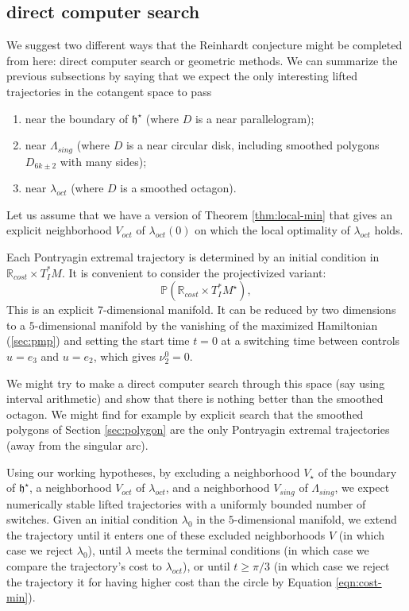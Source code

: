\documentclass{article}
\theoremstyle{remark}
\newcommand{\ring}[1]{\mathbb{#1}}
\def\hstar{{\mathfrak h}^\star}
\newcommand\Lsing{\Lambda_{sing}}
\begin{document}
\subsection{direct computer search}

We suggest two different ways that the Reinhardt conjecture might be
completed from here: direct computer search or geometric methods.
We can summarize the previous subsections by saying that we expect
the only interesting lifted trajectories in the cotangent space to pass
\begin{enumerate}
\item near the boundary of $\hstar$ (where $D$ is a near parallelogram);
\item near $\Lsing$ (where $D$ is a near circular disk, including
  smoothed polygons $D_{6k\pm 2}$ with many sides);
\item near $\lambda_{oct}$ (where $D$ is a smoothed octagon).
\end{enumerate}
Let us assume that we have a version of Theorem \ref{thm:local-min} that gives
an explicit neighborhood $V_{oct}$ of $\lambda_{oct}(0)$ on which the
local optimality of $\lambda_{oct}$ holds.

Each Pontryagin extremal trajectory is determined by an initial
condition in $\ring{R}_{cost}\times T_I^*M$.  It is convenient to
consider the projectivized variant:
\[
\ring{P}(\ring{R}_{cost}\times T_I^* M^\star),
\]
This is an explicit $7$-dimensional manifold.  It can be
reduced by two dimensions to a $5$-dimensional manifold
by the vanishing of the maximized
Hamiltonian (\ref{sec:pmp}) and setting the start time $t=0$ at a
switching time between controls $u=e_3$ and $u=e_2$, which
gives $\nu_2^0=0$.


We might try to make a direct computer search through this space (say
using interval arithmetic) and show that there is nothing better than
the smoothed octagon.  We might find for example by explicit search
that the smoothed polygons of Section \ref{sec:polygon} are the only
Pontryagin extremal trajectories (away from the singular arc).

Using our working hypotheses, by excluding a neighborhood $V_\star$ of the
boundary of $\hstar$, a neighborhood $V_{oct}$ of $\lambda_{oct}$, and a
neighborhood $V_{sing}$ of $\Lsing$, we expect numerically stable lifted trajectories
with a uniformly bounded number of switches.  Given an initial
condition $\lambda_0$ in the $5$-dimensional manifold, we extend the
trajectory until it enters one of these excluded neighborhoods $V$ (in
which case we reject $\lambda_0$), until $\lambda$ meets the terminal
conditions (in which case we compare the trajectory's cost to
$\lambda_{oct}$), or until $t\ge \pi/3$ (in which case we reject the
trajectory it for having higher cost than the circle by Equation \ref{eqn:cost-min}).
\end{document}
